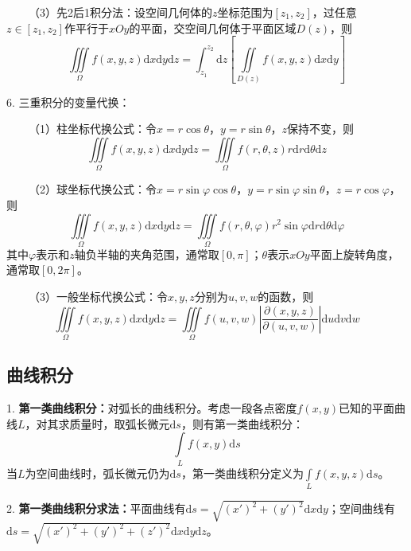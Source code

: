 ~~~~（3）先2后1积分法：设空间几何体的$z$坐标范围为$[z_1,z_2]$，过任意$z\in[z_1,z_2]$作平行于$xOy$的平面，交空间几何体于平面区域$D(z)$，则
\begin{equation*}
    \iiint\limits_\Omega f(x,y,z)\mathrm{d}x\mathrm{d}y\mathrm{d}z=\int_{z_1}^{z_2}\mathrm{d}z\left[\iint\limits_{D(z)}f(x,y,z)\mathrm{d}x\mathrm{d}y\right]
\end{equation*}

6. 三重积分的变量代换：

~~~~（1）柱坐标代换公式：令$x=r\cos\theta$，$y=r\sin\theta$，$z$保持不变，则
\begin{equation*}
    \iiint\limits_{\Omega}f(x,y,z)\mathrm{d}x\mathrm{d}y\mathrm{d}z=\iiint\limits_{\Omega}f(r,\theta,z)r\mathrm{d}r\mathrm{d}\theta\mathrm{d}z
\end{equation*}

~~~~（2）球坐标代换公式：令$x=r\sin\varphi\cos\theta$，$y=r\sin\varphi\sin\theta$，$z=r\cos\varphi$，则
\begin{equation*}
    \iiint\limits_{\Omega}f(x,y,z)\mathrm{d}x\mathrm{d}y\mathrm{d}z=\iiint\limits_{\Omega}f(r,\theta,\varphi)r^2\sin\varphi\mathrm{d}r\mathrm{d}\theta\mathrm{d}\varphi
\end{equation*}
其中$\varphi$表示和$z$轴负半轴的夹角范围，通常取$[0,\pi]$；$\theta$表示$xOy$平面上旋转角度，通常取$[0,2\pi]$。

~~~~（3）一般坐标代换公式：令$x,y,z$分别为$u,v,w$的函数，则
\begin{equation*}
    \iiint\limits_{\Omega}f(x,y,z)\mathrm{d}x\mathrm{d}y\mathrm{d}z=\iiint\limits_{\Omega}f(u,v,w)\left|\frac{\partial(x,y,z)}{\partial(u,v,w)}\right|\mathrm{d}u\mathrm{d}v\mathrm{d}w
\end{equation*}

\subsection{曲线积分}

1. \textbf{第一类曲线积分：}对弧长的曲线积分。考虑一段各点密度$f(x,y)$已知的平面曲线$L$，对其求质量时，取弧长微元$\mathrm{d}s$，则有第一类曲线积分：
\begin{equation*}
    \int\limits_L f(x,y)\mathrm{d} s
\end{equation*}
当$L$为空间曲线时，弧长微元仍为$\mathrm{d}s$，第一类曲线积分定义为$\int \limits_L f(x,y,z)\mathrm{d} s$。

2. \textbf{第一类曲线积分求法：}平面曲线有$\mathrm{d}s=\sqrt{(x')^2+(y')^2} \mathrm{d}x\mathrm{d}y$；空间曲线有$\mathrm{d}s=\sqrt{(x')^2+(y')^2+(z')^2} \mathrm{d}x\mathrm{d}y\mathrm{d}z$。

